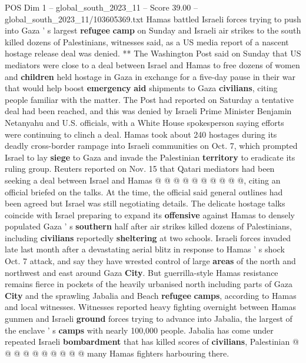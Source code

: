 \begin{textsample}{POS Dim 1 – global\_south\_2023\_11 – Score 39.00 – global\_south\_2023\_11/103605369.txt}  \label{ex:f1_pos_122}
Hamas battled Israeli forces trying to push into Gaza ' s largest \textbf{refugee} \textbf{camp} on Sunday and Israeli air strikes to the south killed dozens of Palestinians, witnesses said, as a US media report of a nascent hostage release deal was denied. ** The Washington Post said on Sunday that US mediators were close to a deal between Israel and Hamas to free dozens of women and \textbf{children} held hostage in Gaza in exchange for a five-day pause in their war that would help boost \textbf{emergency} \textbf{aid} shipments to Gaza \textbf{civilians}, citing people familiar with the matter.
The Post had reported on Saturday a tentative deal had been reached, and this was denied by Israeli Prime Minister Benjamin Netanyahu and U.S. officials, with a White House spokesperson saying efforts were continuing to clinch a deal.
Hamas took about 240 hostages during its deadly cross-border rampage into Israeli communities on Oct. 7, which prompted Israel to lay \textbf{siege} to Gaza and invade the Palestinian \textbf{territory} to eradicate its ruling group.
Reuters reported on Nov. 15 that Qatari mediators had been seeking a deal between Israel and Hamas @ @ @ @ @ @ @ @ @ @, citing an official briefed on the talks.
At the time, the official said general outlines had been agreed but Israel was still negotiating details.
The delicate hostage talks coincide with Israel preparing to expand its \textbf{offensive} against Hamas to densely populated Gaza ' s \textbf{southern} half after air strikes killed dozens of Palestinians, including \textbf{civilians} reportedly \textbf{sheltering} at two schools.
Israeli forces invaded late last month after a devastating aerial blitz in response to Hamas ' s shock Oct. 7 attack, and say they have wrested control of large \textbf{areas} of the north and northwest and east around Gaza \textbf{City}.
But guerrilla-style Hamas resistance remains fierce in pockets of the heavily urbanised north including parts of Gaza \textbf{City} and the sprawling Jabalia and Beach \textbf{refugee} \textbf{camps}, according to Hamas and local witnesses.
Witnesses reported heavy fighting overnight between Hamas gunmen and Israeli \textbf{ground} forces trying to advance into Jabalia, the largest of the enclave ' s \textbf{camps} with nearly 100,000 people.
Jabalia has come under repeated Israeli \textbf{bombardment} that has killed scores of \textbf{civilians}, Palestinian @ @ @ @ @ @ @ @ @ @ many Hamas fighters harbouring there.

\end{textsample}

